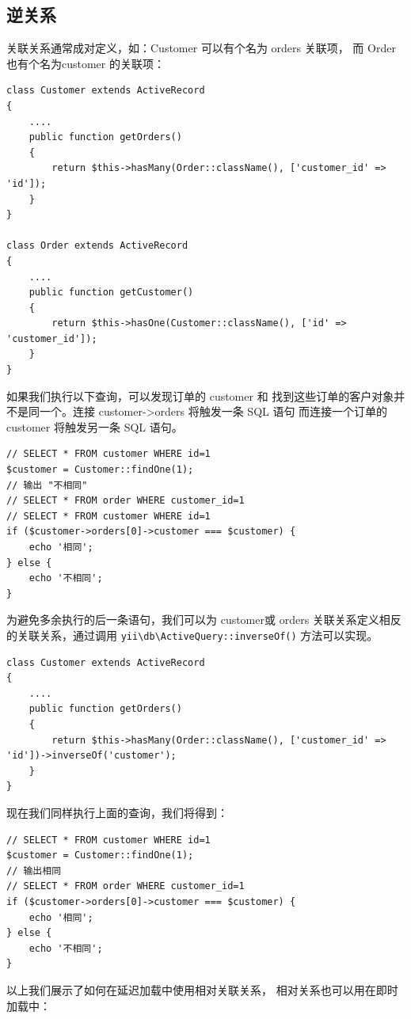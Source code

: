 \subsection{逆关系}
关联关系通常成对定义，如：Customer 可以有个名为 orders 关联项， 而 Order 也有个名为customer 的关联项：

\lstset{language=php}\begin{lstlisting}
class Customer extends ActiveRecord
{
    ....
    public function getOrders()
    {
        return $this->hasMany(Order::className(), ['customer_id' => 'id']);
    }
}

class Order extends ActiveRecord
{
    ....
    public function getCustomer()
    {
        return $this->hasOne(Customer::className(), ['id' => 'customer_id']);
    }
}
\end{lstlisting}
如果我们执行以下查询，可以发现订单的 customer 和 找到这些订单的客户对象并不是同一个。连接 customer->orders 将触发一条 SQL 语句 而连接一个订单的 customer 将触发另一条 SQL 语句。

\lstset{language=php}\begin{lstlisting}
// SELECT * FROM customer WHERE id=1
$customer = Customer::findOne(1);
// 输出 "不相同"
// SELECT * FROM order WHERE customer_id=1
// SELECT * FROM customer WHERE id=1
if ($customer->orders[0]->customer === $customer) {
    echo '相同';
} else {
    echo '不相同';
}
\end{lstlisting}
为避免多余执行的后一条语句，我们可以为 customer或 orders 关联关系定义相反的关联关系，通过调用 \texttt{yii{\allowbreak{}\textbackslash}db{\allowbreak{}\textbackslash}ActiveQuery\allowbreak{}::\allowbreak{}inverseOf()} 方法可以实现。

\lstset{language=php}\begin{lstlisting}
class Customer extends ActiveRecord
{
    ....
    public function getOrders()
    {
        return $this->hasMany(Order::className(), ['customer_id' => 'id'])->inverseOf('customer');
    }
}
\end{lstlisting}
现在我们同样执行上面的查询，我们将得到：

\lstset{language=php}\begin{lstlisting}
// SELECT * FROM customer WHERE id=1
$customer = Customer::findOne(1);
// 输出相同
// SELECT * FROM order WHERE customer_id=1
if ($customer->orders[0]->customer === $customer) {
    echo '相同';
} else {
    echo '不相同';
}
\end{lstlisting}
以上我们展示了如何在延迟加载中使用相对关联关系， 相对关系也可以用在即时加载中：

